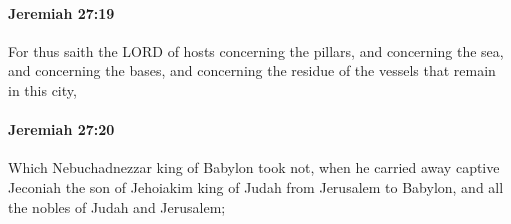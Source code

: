 		\paragraph{Jeremiah 27:19} %
			\label{JEREMIAH-27-19}

			For thus saith the LORD of hosts concerning the pillars, and concerning the sea, and concerning the bases, and concerning the residue of the vessels that remain in this city,


		\paragraph{Jeremiah 27:20} %
			\label{JEREMIAH-27-20}

			Which Nebuchadnezzar king of Babylon took not, when he carried away captive Jeconiah the son of Jehoiakim king of Judah from Jerusalem to Babylon, and all the nobles of Judah and Jerusalem;

